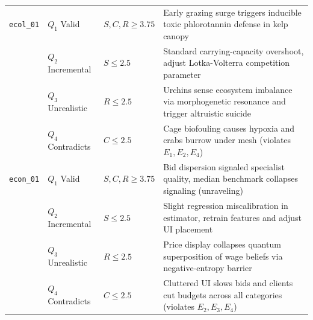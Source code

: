 \documentclass{article}
\begin{document}
\begin{table}[h]
\begin{tabular}{lllp{6.8cm}}
\midrule
\texttt{ecol\_01} & $Q_1$ Valid & $S,C,R \ge 3.75$ & Early grazing surge triggers inducible toxic phlorotannin defense in kelp canopy \\
 & $Q_2$ Incremental & $S \le 2.5$ & Standard carrying-capacity overshoot, adjust Lotka-Volterra competition parameter \\
 & $Q_3$ Unrealistic & $R \le 2.5$ & Urchins sense ecosystem imbalance via morphogenetic resonance and trigger altruistic suicide \\
 & $Q_4$ Contradicts & $C \le 2.5$ & Cage biofouling causes hypoxia and crabs burrow under mesh (violates $E_1, E_2, E_4$) \\
\midrule
\texttt{econ\_01} & $Q_1$ Valid & $S,C,R \ge 3.75$ & Bid dispersion signaled specialist quality, median benchmark collapses signaling (unraveling) \\
 & $Q_2$ Incremental & $S \le 2.5$ & Slight regression miscalibration in estimator, retrain features and adjust UI placement \\
 & $Q_3$ Unrealistic & $R \le 2.5$ & Price display collapses quantum superposition of wage beliefs via negative-entropy barrier \\
 & $Q_4$ Contradicts & $C \le 2.5$ & Cluttered UI slows bids and clients cut budgets across all categories (violates $E_2, E_3, E_4$) \\
\bottomrule
\end{tabular}
\end{table}
\end{document}

